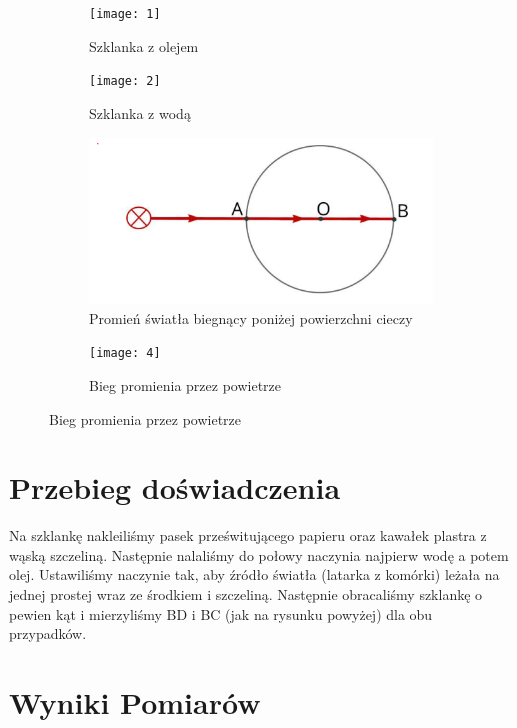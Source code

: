 \documentclass[]{article}
\begin{document}
\begin{figure}[H]
  \centering
  \begin{subfigure}[b]{0.4\linewidth}
    \texttt{[image: 1]}
    \caption{Szklanka z olejem}
  \end{subfigure}
  \begin{subfigure}[b]{0.4\linewidth}
    \texttt{[image: 2]}
    \caption{Szklanka z wodą}
  \end{subfigure}
  \begin{subfigure}[b]{0.4\linewidth}
    \includegraphics[width=\linewidth]{3}
    \caption{Promień światła biegnący
poniżej powierzchni cieczy }
  \end{subfigure}
  \begin{subfigure}[b]{0.4\linewidth}
    \texttt{[image: 4]}
    \caption{Bieg promienia przez powietrze}
  \end{subfigure}
  
\end{figure}




\section{Przebieg doświadczenia}
Na szklankę nakleiliśmy pasek prześwitującego papieru oraz kawałek plastra z wąską szczeliną. Następnie nalaliśmy do połowy naczynia najpierw wodę a potem olej.  Ustawiliśmy naczynie tak, aby źródło światła (latarka z komórki) leżała na jednej prostej wraz ze środkiem i szczeliną. Następnie obracaliśmy szklankę o pewien kąt i mierzyliśmy BD i BC (jak na rysunku powyżej) dla obu przypadków. 

\newpage

\section{Wyniki Pomiarów}
\end{document}

